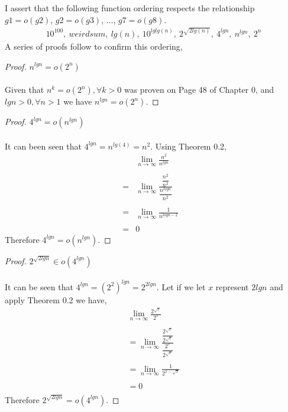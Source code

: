 \documentclass[12pt]{article}
\newenvironment{question}[2][Question]{\begin{trivlist}
\item[\hskip \labelsep {\bfseries #1}\hskip \labelsep {\bfseries #2.}]}{\end{trivlist}}
\begin{document}
\begin{question}{4}
  I assert that the following function ordering respects the relationship
  $g1 = o(g2)$, $g2 = o(g3)$, ..., $g7 = o(g8)$.
  \begin{align*}
    10^{100},\ weirdsum,\ lg(n),\ 10^{lglg(n)},\ 2^{\sqrt{2lg(n)}},\ 4^{lgn},\ n^{lgn},\ 2^{n}
  \end{align*}
  A series of proofs follow to confirm this ordering,

  \begin{proof} $n^{lgn} = o(2^{n})$
    \leavevmode \\ \\
    Given that $n^{k} = o(2^{n}), \forall k > 0$ was proven on Page 48 of Chapter 0,
    and $lgn > 0, \forall n > 1$ we have $n^{lgn} = o(2^{n})$.
  \end{proof}

  \begin{proof} $4^{lgn} = o(n^{lgn})$
    \leavevmode \\ \\
    It can been seen that $4^{lgn} = n^{lg(4)} = n^{2}$.  Using Theorem 0.2,
    \begin{align*}
      &\lim_{n\to\infty} \frac{
        n^{2}
      }{
        n^{lgn}
      }&\\ \\
      = &\lim_{n\to\infty} \frac{
        \dfrac{n^{2}}{n^{2}}
      }{
        \dfrac{n^{logn}}{n^{2}}
      }&\\ \\
      = & \lim_{n\to\infty} \frac{
        1
      }{n^{logn - 2}}\\ \\
      = & 0
    \end{align*}
    Therefore $4^{lgn} = o(n^{lgn})$.
  \end{proof}

  \begin{proof} $2^{\sqrt{2lgn}} \in o(4^{lgn})$
    \leavevmode \\ \\
    It can be seen that $4^{lgn} = (2^{2})^{lgn} = 2^{2lgn}$.
    Let if we let $x$ represent $2lgn$ and apply Theorem 0.2 we have,
    \begin{align*}
      &\lim_{n\to\infty} \frac{
        2^{\sqrt{x}}
      }{
        2^{x}
      }&\\ \\
      & = \lim_{n\to\infty} \frac{
        \dfrac{
          2^{\sqrt{x}}
        }{
          2^{\sqrt{x}}
        }
      }{
        \dfrac{
          2^{x}
        }{
          2^{\sqrt{x}}
        }
      }&\\ \\
      & = \lim_{n\to\infty} \frac{1}{
        2^{x - \sqrt{x}}
      }&\\ \\
      & = 0&\\
    \end{align*}
    Therefore $2^{\sqrt{2lgn}} = o(4^{lgn})$.
  \end{proof}
\end{question}
\end{document}
